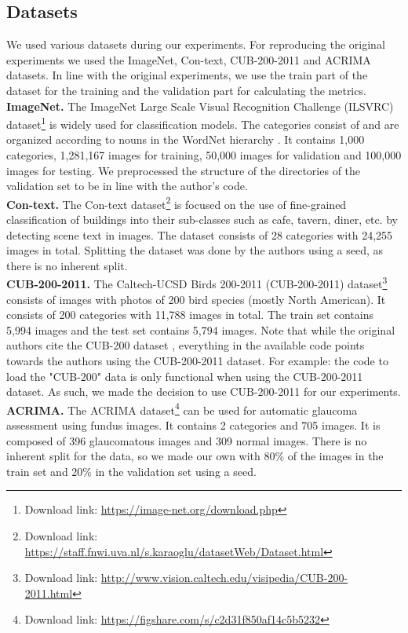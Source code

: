 \subsection{Datasets}
We used various datasets during our experiments. For reproducing the original experiments we used the ImageNet, Con-text, CUB-200-2011 and ACRIMA datasets. In line with the original experiments, we use the train part of the dataset for the training and the validation part for calculating the metrics.
\\
\textbf{ImageNet.}
The ImageNet Large Scale Visual Recognition Challenge (ILSVRC) dataset\footnote{Download link: \url{https://image-net.org/download.php}} \cite{imagenet} is widely used for classification models. The categories consist of and are organized according to nouns in the WordNet hierarchy \cite{wordnet}. It contains 1,000 categories, 1,281,167 images for training, 50,000 images for validation and 100,000 images for testing. We preprocessed the structure of the directories of the validation set to be in line with the author's code.
\\
\textbf{Con-text.} The Con-text dataset\footnote{Download link: \url{https://staff.fnwi.uva.nl/s.karaoglu/datasetWeb/Dataset.html}} \cite{con-text} is focused on the use of fine-grained classification of buildings into their sub-classes such as cafe, tavern, diner, etc. by detecting scene text in images. The dataset consists of 28 categories with 24,255 images in total. Splitting the dataset was done by the authors using a seed, as there is no inherent split.
\\
\textbf{CUB-200-2011.} The Caltech-UCSD Birds 200-2011 (CUB-200-2011) dataset\footnote{Download link: \url{http://www.vision.caltech.edu/visipedia/CUB-200-2011.html}} \cite{cub-200} consists of images with photos of 200 bird species (mostly North American). It consists of 200 categories with 11,788 images in total. The train set contains 5,994 images and the test set contains 5,794 images. Note that while the original authors cite the CUB-200 dataset \cite{cub-200-old}, everything in the available code points towards the authors using the CUB-200-2011 dataset. For example: the code to load the "CUB-200" data is only functional when using the CUB-200-2011 dataset. As such, we made the decision to use CUB-200-2011 for our experiments.
\\
\textbf{ACRIMA.} The ACRIMA dataset\footnote{Download link: \url{https://figshare.com/s/c2d31f850af14c5b5232}} \cite{acrima} can be used for automatic glaucoma assessment using fundus images. It contains 2 categories and 705 images. It is composed of 396 glaucomatous images and 309 normal images. There is no inherent split for the data, so we made our own with 80\% of the images in the train set and 20\% in the validation set using a seed.



